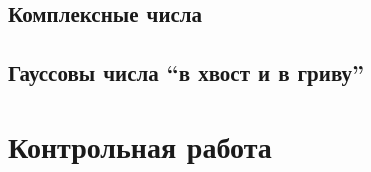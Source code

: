\documentclass[10pt, twoside]{article}
\begin{document}
\subsection{Комплексные числа}
% 
\subsection{Гауссовы числа ``в хвост и в гриву''} %

\newpage
{}
\section*{Контрольная работа}
% 
\end{document}
